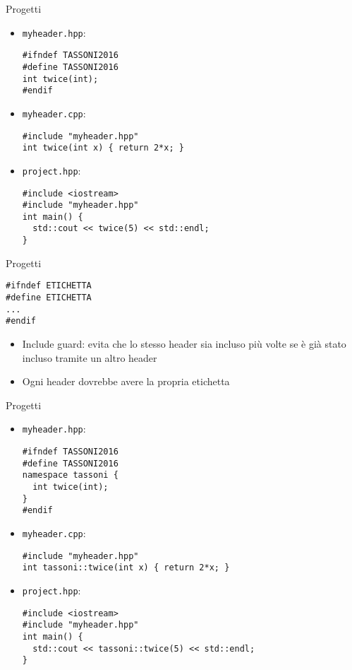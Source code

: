 \begin{frame}[fragile]{Progetti}
  \vfill
  \begin{itemize}
    \item \lstinline$myheader.hpp$:
  \begin{lstlisting}
#ifndef TASSONI2016
#define TASSONI2016
int twice(int);
#endif\end{lstlisting}
  \vfill
    \item \lstinline$myheader.cpp$:
  \begin{lstlisting}
#include "myheader.hpp"
int twice(int x) { return 2*x; }\end{lstlisting}
  \vfill
    \item \lstinline$project.hpp$:
    \begin{lstlisting}
#include <iostream>
#include "myheader.hpp"
int main() {
  std::cout << twice(5) << std::endl;
}\end{lstlisting}
  \end{itemize}
  \vfill
\end{frame}

\begin{frame}[fragile]{Progetti}
  \vfill
  \begin{lstlisting}
#ifndef ETICHETTA
#define ETICHETTA
...
#endif
  \end{lstlisting}
  \vfill
  \begin{itemize}
    \item \alert{Include guard}: evita che lo stesso header sia incluso più volte
    se è già stato incluso tramite un altro header
    \vfill
    \item Ogni header dovrebbe avere la propria etichetta
  \end{itemize}
  \vfill
\end{frame}

\begin{frame}[fragile]{Progetti}
  \vfill
  \begin{itemize}
    \item \lstinline$myheader.hpp$:
  \begin{lstlisting}
#ifndef TASSONI2016
#define TASSONI2016
namespace tassoni {
  int twice(int);
}
#endif\end{lstlisting}
  \vfill
    \item \lstinline$myheader.cpp$:
  \begin{lstlisting}
#include "myheader.hpp"
int tassoni::twice(int x) { return 2*x; }\end{lstlisting}
  \vfill
    \item \lstinline$project.hpp$:
    \begin{lstlisting}
#include <iostream>
#include "myheader.hpp"
int main() {
  std::cout << tassoni::twice(5) << std::endl;
}\end{lstlisting}
  \end{itemize}
  \vfill
\end{frame}

